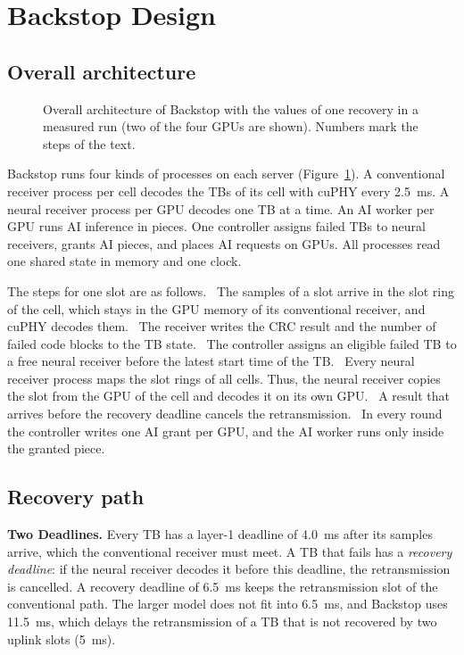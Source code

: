 \documentclass[acmsmall,screen,review,anonymous]{acmart}
\newcommand{\sys}{Backstop\xspace}
\begin{document}
\section{Backstop Design}

\subsection{Overall architecture}

\begin{figure}[t]
\centering
\resizebox{\linewidth}{!}{}
\caption{Overall architecture of \sys with the values of one recovery in a measured run (two of the four
GPUs are shown). Numbers mark the steps of the text.}
\label{fig:architecture}
\end{figure}

\sys runs four kinds of processes on each server (Figure~\ref{fig:architecture}). A conventional receiver
process per cell decodes the TBs of its cell with cuPHY every 2.5~ms. A neural receiver process per GPU
decodes one TB at a time. An AI worker per GPU runs AI inference in pieces. One controller assigns failed TBs
to neural receivers, grants AI pieces, and places AI requests on GPUs. All processes read one shared state
in memory and one clock.

The steps for one slot are as follows. ~The samples of a slot arrive in the slot ring of the cell,
which stays in the GPU memory of its conventional receiver, and cuPHY decodes them. ~The receiver
writes the CRC result and the number of failed code blocks to the TB state. ~The controller
assigns an eligible failed TB to a free neural receiver before the latest start time of the TB.
~Every neural receiver process maps the slot rings of all cells. Thus, the neural receiver copies
the slot from the GPU of the cell and decodes it on its own GPU. ~A result that arrives before
the recovery deadline cancels the retransmission. ~In every round the controller writes one AI
grant per GPU, and the AI worker runs only inside the granted piece.

\subsection{Recovery path}

\noindent\textbf{Two Deadlines.} Every TB has a layer-1 deadline of 4.0~ms after its samples arrive, which
the conventional receiver must meet. A TB that fails has a \emph{recovery deadline}: if the neural receiver
decodes it before this deadline, the retransmission is cancelled. A recovery deadline of 6.5~ms keeps the
retransmission slot of the conventional path. The larger model does not fit into 6.5~ms, and \sys uses
11.5~ms, which delays the retransmission of a TB that is not recovered by two uplink slots (5~ms).
\end{document}
